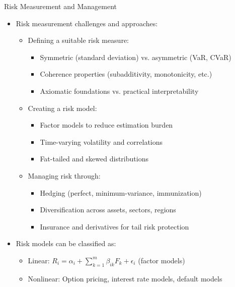 \documentclass[10pt]{beamer}
\begin{document}
\begin{frame}{Risk Measurement and Management}
  \begin{itemize}[<+->]
    \item Risk measurement challenges and approaches:
      \begin{itemize}
        \item Defining a suitable risk measure:
          \begin{itemize}
            \item Symmetric (standard deviation) vs. asymmetric (VaR, CVaR)
            \item Coherence properties (subadditivity, monotonicity, etc.)
            \item Axiomatic foundations vs. practical interpretability
          \end{itemize}
        \item Creating a risk model:
          \begin{itemize}
            \item Factor models to reduce estimation burden
            \item Time-varying volatility and correlations
            \item Fat-tailed and skewed distributions
          \end{itemize}
        \item Managing risk through:
          \begin{itemize}
            \item Hedging (perfect, minimum-variance, immunization)
            \item Diversification across assets, sectors, regions
            \item Insurance and derivatives for tail risk protection
          \end{itemize}
      \end{itemize}
    \item Risk models can be classified as:
      \begin{itemize}
        \item Linear: $R_i = \alpha_i + \sum_{k=1}^{m} \beta_{ik}F_k + \epsilon_i$ (factor models)
        \item Nonlinear: Option pricing, interest rate models, default models
      \end{itemize}
  \end{itemize}
\end{frame}
\end{document}
